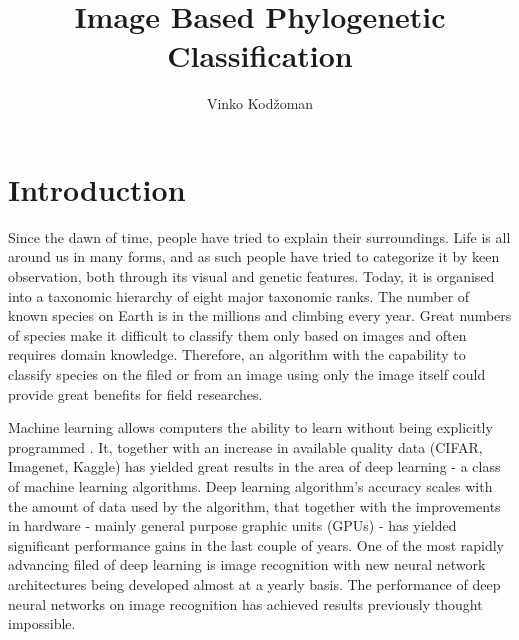 \documentclass[times, utf8, diplomski]{fer}
\begin{document}
\title{Image Based Phylogenetic Classification}
\author{Vinko Kodžoman}

\maketitle

\izvornik


\tableofcontents

\chapter{Introduction}
Since the dawn of time, people have tried to explain their surroundings. Life is all around us in many forms, and as such people have tried to categorize it by keen observation, both through its visual and genetic features. Today, it is organised into a taxonomic hierarchy of eight major taxonomic ranks. The number of known species on Earth is in the millions and climbing every year. Great numbers of species make it difficult to classify them only based on images and often requires domain knowledge. Therefore, an algorithm with the capability to classify species on the filed or from an image using only the image itself could provide great benefits for field researches.

Machine learning allows computers the ability to learn without being explicitly programmed \citep{samuel_studies_1959}. It, together with an increase in available quality data (CIFAR, Imagenet, Kaggle) has yielded great results in the area of deep learning - a class of machine learning algorithms. Deep learning algorithm's accuracy scales with the amount of data used by the algorithm, that together with the improvements in hardware - mainly general purpose graphic units (GPUs) - has yielded significant performance gains in the last couple of years. One of the most rapidly advancing filed of deep learning is image recognition \citep{krizhevsky_imagenet_2012, simonyan_very_2014, szegedy_going_2015, he_deep_2016} with new neural network architectures being developed almost at a yearly basis. The performance of deep neural networks on image recognition has achieved results previously thought impossible.
\end{document}
